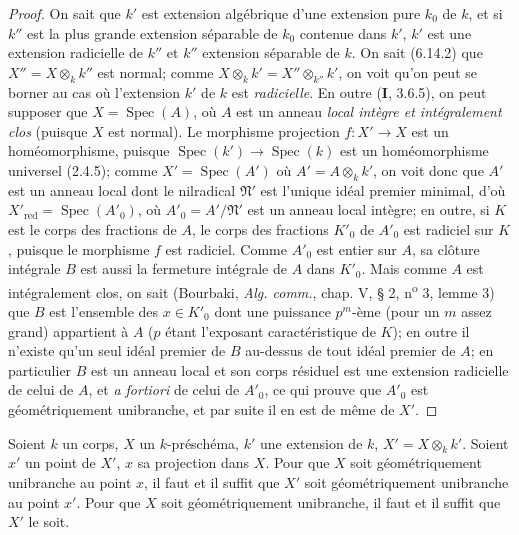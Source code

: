 \begin{proof}
On sait que $k'$ est extension algébrique d'une extension pure $k_0$ de
$k$, et si $k''$ est la plus grande extension séparable de $k_0$ contenue
dans $k'$, $k'$ est une extension radicielle de $k''$ et $k''$ extension
séparable de $k$. On sait (6.14.2) que $X''=X\otimes_k k''$ est normal;
comme $X\otimes_k k'=X''\otimes_{k''}k'$, on voit qu'on peut se borner au
cas où l'extension $k'$ de $k$ est \emph{radicielle}. En outre (\textbf{I}, 3.6.5), on peut
supposer que $X=\operatorname{Spec}(A)$, où $A$ est un anneau \emph{local intègre
et intégralement clos} (puisque $X$ est normal). Le morphisme projection
$f:X'\to X$ est un homéomorphisme, puisque
$\operatorname{Spec}(k')\to\operatorname{Spec}(k)$ est un homéomorphisme
universel (2.4.5); comme $X'=\operatorname{Spec}(A')$ où
$A'=A\otimes_k k'$, on voit donc que $A'$ est un anneau local dont le
nilradical $\mathfrak N'$ est l'unique idéal premier minimal, d'où
$X'_{\mathrm{red}}=\operatorname{Spec}(A'_0)$, où
$A'_0=A'/\mathfrak N'$ est un anneau local intègre; en outre, si $K$ est
le corps des fractions de $A$, le corps des fractions $K'_0$ de $A'_0$ est
radiciel sur $K$, puisque le morphisme $f$ est radiciel. Comme $A'_0$ est
entier sur $A$, sa clôture intégrale $B$ est aussi la fermeture intégrale
de $A$ dans $K'_0$. Mais comme $A$ est intégralement clos, on sait
(Bourbaki, \emph{Alg. comm.}, chap. V, § 2, n\textsuperscript{o} 3, lemme 3) que $B$ est
l'ensemble des $x\in K'_0$ dont une puissance $p^m$-ème (pour un $m$ assez
grand) appartient à $A$ ($p$ étant l'exposant caractéristique de $K$);
en outre il n'existe qu'un seul idéal premier de $B$ au-dessus de tout idéal
premier de $A$; en particulier $B$ est un anneau local et son corps résiduel
est une extension radicielle de celui de $A$, et \emph{a fortiori} de celui de
$A'_0$, ce qui prouve que $A'_0$ est géométriquement unibranche, et par
suite il en est de même de $X'$.
\end{proof}

\begin{proposition}[6.15.7]
Soient $k$ un corps, $X$ un $k$-préschéma, $k'$ une extension de $k$,
$X'=X\otimes_k k'$. Soient $x'$ un point de $X'$, $x$ sa projection dans
$X$. Pour que $X$ soit géométriquement unibranche au point $x$, il faut et
il suffit que $X'$ soit géométriquement unibranche au point $x'$. Pour que
$X$ soit géométriquement unibranche, il faut et il suffit que $X'$ le soit.
\end{proposition}


